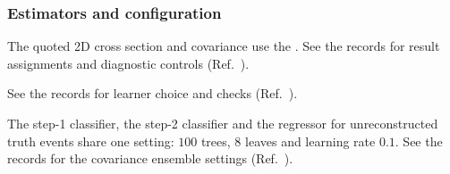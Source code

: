 \subsubsection{Estimators and configuration}
\label{sec:method-config}

The quoted 2D cross section and covariance use the \estTwoD{}. See the records for result assignments and diagnostic controls (Ref.~\cite{NoteRecords2026}).

See the records for learner choice and checks (Ref.~\cite{NoteRecords2026}).

The step-1 classifier, the step-2 classifier and the regressor for unreconstructed truth events share one setting: $100$ trees, $8$ leaves and learning rate $0.1$. See the records for the covariance ensemble settings (Ref.~\cite{NoteRecords2026}).

